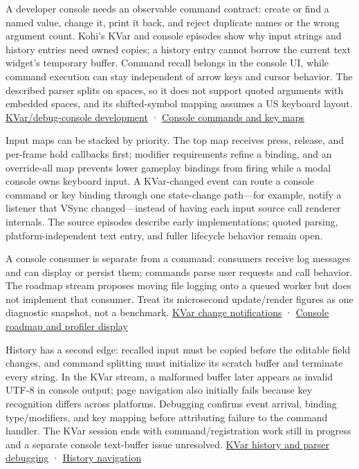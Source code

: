 A developer console needs an observable command contract: create or find a named value, change it, print it back, and reject duplicate names or the wrong argument count. Kohi's KVar and console episodes show why input strings and history entries need owned copies; a history entry cannot borrow the current text widget's temporary buffer. Command recall belongs in the console UI, while command execution can stay independent of arrow keys and cursor behavior. The described parser splits on spaces, so it does not support quoted arguments with embedded spaces, and its shifted-symbol mapping assumes a US keyboard layout. \href{https://www.youtube.com/watch?v=vPaRWwSjki4}{KVar/debug-console development} · \href{https://www.youtube.com/watch?v=MM73i0sVXsc}{Console commands and key maps}

Input maps can be stacked by priority. The top map receives press, release, and per-frame hold callbacks first; modifier requirements refine a binding, and an override-all map prevents lower gameplay bindings from firing while a modal console owns keyboard input. A KVar-changed event can route a console command or key binding through one state-change path---for example, notify a listener that VSync changed---instead of having each input source call renderer internals. The source episodes describe early implementations; quoted parsing, platform-independent text entry, and fuller lifecycle behavior remain open.

A console consumer is separate from a command: consumers receive log messages and can display or persist them; commands parse user requests and call behavior. The roadmap stream proposes moving file logging onto a queued worker but does not implement that consumer. Treat its microsecond update/render figures as one diagnostic snapshot, not a benchmark. \href{https://www.youtube.com/watch?v=6cn8Ip0IJsw}{KVar change notifications} · \href{https://www.youtube.com/watch?v=MM73i0sVXsc}{Console roadmap and profiler display}

History has a second edge: recalled input must be copied before the editable field changes, and command splitting must initialize its scratch buffer and terminate every string. In the KVar stream, a malformed buffer later appears as invalid UTF-8 in console output; page navigation also initially fails because key recognition differs across platforms. Debugging confirms event arrival, binding type/modifiers, and key mapping before attributing failure to the command handler. The KVar session ends with command/registration work still in progress and a separate console text-buffer issue unresolved. \href{https://www.youtube.com/watch?v=tXPhFa7GGMs}{KVar history and parser debugging} · \href{https://www.youtube.com/watch?v=vPaRWwSjki4}{History navigation}

